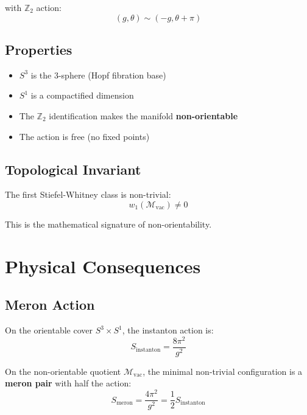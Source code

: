 \documentclass[11pt]{article}
\begin{document}
with $\mathbb{Z}_2$ action:
\begin{equation}
(g, \theta) \sim (-g, \theta + \pi)
\end{equation}

\subsection{Properties}

\begin{itemize}
    \item $S^3$ is the 3-sphere (Hopf fibration base)
    \item $S^1$ is a compactified dimension
    \item The $\mathbb{Z}_2$ identification makes the manifold \textbf{non-orientable}
    \item The action is free (no fixed points)
\end{itemize}

\subsection{Topological Invariant}

The first Stiefel-Whitney class is non-trivial:
\begin{equation}
w_1(\mathcal{M}_{\text{vac}}) \neq 0
\end{equation}

This is the mathematical signature of non-orientability.

\section{Physical Consequences}

\subsection{Meron Action}

On the orientable cover $S^3 \times S^1$, the instanton action is:
\begin{equation}
S_{\text{instanton}} = \frac{8\pi^2}{g^2}
\end{equation}

On the non-orientable quotient $\mathcal{M}_{\text{vac}}$, the minimal 
non-trivial configuration is a \textbf{meron pair} with half the action:
\begin{equation}
\boxed{S_{\text{meron}} = \frac{4\pi^2}{g^2} = \frac{1}{2} S_{\text{instanton}}}
\end{equation}
\end{document}
